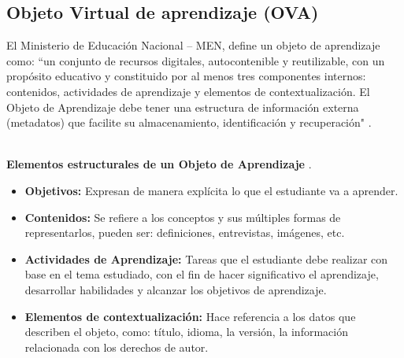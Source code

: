 \subsection{Objeto Virtual de aprendizaje (OVA)}
El Ministerio de Educación Nacional – MEN, define un objeto de aprendizaje como: ``un conjunto de recursos digitales, autocontenible y reutilizable, con un propósito educativo y constituido por al menos tres componentes internos: contenidos, actividades de aprendizaje y elementos de contextualización. El Objeto de Aprendizaje debe tener una estructura de información externa (metadatos) que facilite su almacenamiento, identificación y recuperación" \cite{men0}.

\ \\  
\textbf{Elementos estructurales de un Objeto de Aprendizaje} \cite{men0}.
\begin{itemize}
\item \textbf{Objetivos:} Expresan de manera explícita lo que el estudiante va a aprender.
\item \textbf{Contenidos:} Se refiere a los conceptos y sus múltiples formas de representarlos, pueden ser: definiciones, entrevistas, imágenes, etc.
\item \textbf{Actividades de Aprendizaje:} Tareas que el estudiante debe realizar con base en el tema estudiado, con el fin de hacer significativo el aprendizaje, desarrollar habilidades y alcanzar los objetivos de aprendizaje.
\item \textbf{Elementos de contextualización:} Hace referencia a los datos que describen el objeto, como: título, idioma, la versión, la información relacionada con los derechos de autor.
\end{itemize}